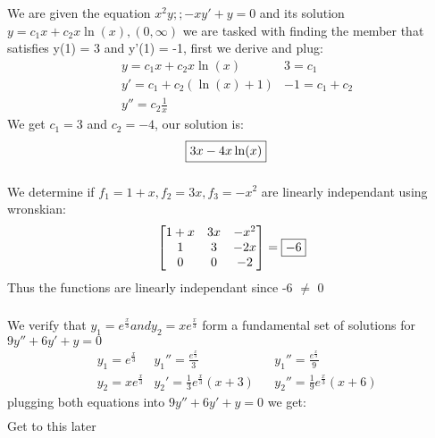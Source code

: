 \documentclass{article}
\begin{document}
\subsubsection{}
We are given the equation $ x^2y;; - xy' + y = 0$ and its solution $ y = c_1x + c_2x \ln(x), (0, \infty)$ we are tasked with finding the member that satisfies y(1) = 3 and y'(1) = -1, first we derive and plug:
\begin{align*}
    & y = c_1x + c_2x\ln(x) & 3 = c_1\\
    & y' = c_1 + c_2(\ln(x) + 1) & -1 = c_1 + c_2\\
    & y'' = c_2 \frac{1}{x} 
\end{align*}
We get $c_1 = 3$ and $c_2 = -4$, our solution is:
\begin{align*}
    \Aboxed{3x -4x\ln(x)}
\end{align*}


\subsubsection{} 
We determine if $f_1 = 1 + x, f_2 = 3x, f_3 = -x^2$ are linearly independant using wronskian:
\begin{equation}
\begin{bmatrix}
    1+x & 3x & -x^2\\
    1 & 3 & -2x \\
    0 & 0 & - 2
\end{bmatrix}
  = \boxed{ -6} \\
\end{equation}
Thus the functions are linearly independant since -6 $\not=$ 0

\subsubsection{}
We verify that $y_1 = e^{\frac{x}{3}} and y_2 = xe^{\frac{x}{3}}$ form a fundamental set of solutions for $ 9y'' +6y' + y = 0$
\begin{align*}
    & y_1 = e^{\frac{x}{3}} & y_1'' = \frac{e^{\frac{x}{3}}}{3} && y_1'' = \frac{e^{\frac{x}{3}}}{9} \\
    & y_2 = xe^{\frac{x}{3}} & y_2'= \frac{1}{3} e^{\frac{x}{3}}(x+3) && y_2'' = \frac{1}{9} e^{\frac{x}{3}}(x+6) 
\end{align*}
plugging both equations into $ 9y'' +6y' + y = 0$ we get:
\begin{align*}
\end{align*}
Get to this later
\end{document}
